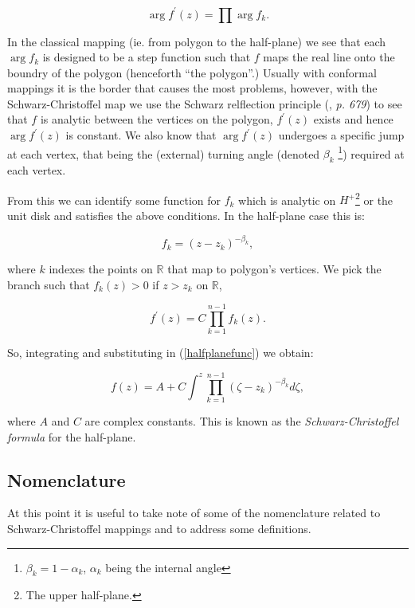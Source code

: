 \documentclass[a4paper,10pt]{amsart}
\newcommand{\sch}{Schwarz-Christoffel }
\newcommand{\fprime}{f^\prime(z)}
\begin{document}
\begin{equation}
\arg \fprime = \prod \arg f_k.
\end{equation}

In the classical mapping (ie. from polygon to the half-plane) we see that each $\arg f_k$ is designed to be a step function such that $f$ maps the real line onto the boundry of the polygon (henceforth ``the polygon''.) Usually with conformal mappings it is the border that causes the most problems, however, with the \sch map we use the Schwarz relflection principle (\cite{handbuch}, \emph{p. 679}) to see that $f$ is analytic between the vertices on the polygon, $\fprime$ exists and hence $\arg \fprime$ is constant. We also know that $\arg \fprime$ undergoes a specific jump at each vertex, that being the (external) turning angle (denoted $\beta_k$ \footnote{$\beta_k = 1-\alpha_k$, $\alpha_k$ being the internal angle}) required at each vertex. 

From this we can identify some function for $f_k$ which is analytic on $H^+$\footnote{The upper half-plane.} or the unit disk and satisfies the above conditions. In the half-plane case this is:

\begin{equation}
\label{halfplanefunc}
f_k = (z-z_k)^{-\beta_k},
\end{equation}

where $k$ indexes the points on $\mathbb{R}$ that map to polygon's vertices. We pick the branch such that $f_k(z)>0$ if $z>z_k$ on $\mathbb{R}$,

\begin{equation}
\fprime = C \prod_{k=1}^{n-1} f_k(z).
\end{equation}

So, integrating and substituting in (\ref{halfplanefunc}) we obtain:

\begin{equation}
f(z) = A + C \int^z \prod_{k=1}^{n-1} (\zeta-z_k)^{-\beta_k} d\zeta,
\end{equation}

where $A$ and $C$ are complex constants. This is known as the \emph{\sch formula} for the half-plane.


\subsection{Nomenclature}

At this point it is useful to take note of some of the nomenclature related to \sch mappings and to address some definitions.
\end{document}

